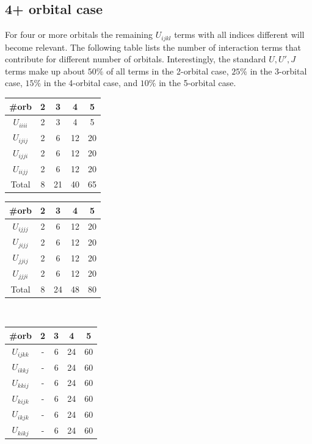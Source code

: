 \documentclass[12pt,a4paper]{scrartcl}
\numberwithin{equation}{section}
\begin{document}
\subsection{4+ orbital case}
For four or more orbitals the remaining $U_{ijkl}$ terms with all indices different will become relevant. 
The following table lists the number of interaction terms that contribute for different number of orbitals.
Interestingly, the standard $U,U',J$ terms make up about $50\%$ of all terms in the 2-orbital case, 
$25\%$ in the 3-orbital case, 
$15\%$ in the 4-orbital case, and
$10\%$ in the 5-orbital case.
\begin{center}
\begin{tabular}{|c||c|c|c|c|}
\hline
 \#orb & 2 & 3 & 4 & 5 \\\hline\hline
 $U_{iiii}$ & 2 & 3  & 4 & 5 \\
 $U_{ijij}$ & 2 & 6  & 12 & 20 \\
 $U_{ijji}$ & 2 & 6  & 12 & 20 \\
 $U_{iijj}$ & 2 & 6  & 12 & 20 \\\hline
 Total     & 8 & 21 & 40 & 65 \\\hline
\end{tabular}
% 
\hspace*{0.3cm}
\begin{tabular}{|c||c|c|c|c|}
\hline
 \#orb & 2 & 3 & 4 & 5 \\\hline\hline
 $U_{ijjj}$ & 2 & 6  & 12 & 20 \\
 $U_{jijj}$ & 2 & 6  & 12 & 20 \\
 $U_{jjij}$ & 2 & 6  & 12 & 20 \\
 $U_{jjji}$ & 2 & 6  & 12 & 20 \\\hline
 Total  & 8 & 24 & 48 & 80 \\\hline
\end{tabular}
% 
\\ \vspace*{0.3cm}
%
\begin{tabular}{|c||c|c|c|c|}
\hline
 \#orb & 2 & 3 & 4 & 5 \\\hline\hline
 $U_{ijkk}$ & - & 6  & 24 & 60 \\
 $U_{ikkj}$ & - & 6  & 24 & 60 \\
 $U_{kkij}$ & - & 6  & 24 & 60 \\
 $U_{kijk}$ & - & 6  & 24 & 60 \\\hline
 $U_{ikjk}$ & - & 6  & 24 & 60 \\
 $U_{kikj}$ & - & 6  & 24 & 60 \\
 \hline

\end{tabular}
\end{center}
\end{document}
